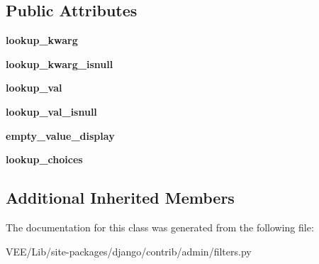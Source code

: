 \subsection*{Public Attributes}
\begin{DoxyCompactItemize}
\item 
\mbox{\label{classdjango_1_1contrib_1_1admin_1_1filters_1_1_all_values_field_list_filter_a2f0e069fadf4337d95d1338b167882f5}} 
{\bfseries lookup\+\_\+kwarg}
\item 
\mbox{\label{classdjango_1_1contrib_1_1admin_1_1filters_1_1_all_values_field_list_filter_abc33e49c3b986584bb404ca551a8854f}} 
{\bfseries lookup\+\_\+kwarg\+\_\+isnull}
\item 
\mbox{\label{classdjango_1_1contrib_1_1admin_1_1filters_1_1_all_values_field_list_filter_a2f6103d6492548bc1e160cb3daaf8db0}} 
{\bfseries lookup\+\_\+val}
\item 
\mbox{\label{classdjango_1_1contrib_1_1admin_1_1filters_1_1_all_values_field_list_filter_af6341d09b162d76a98a68b9562c5237c}} 
{\bfseries lookup\+\_\+val\+\_\+isnull}
\item 
\mbox{\label{classdjango_1_1contrib_1_1admin_1_1filters_1_1_all_values_field_list_filter_a3d4e19bc502d9f7c76ff21527455c6dd}} 
{\bfseries empty\+\_\+value\+\_\+display}
\item 
\mbox{\label{classdjango_1_1contrib_1_1admin_1_1filters_1_1_all_values_field_list_filter_a0658c943b541f0e975a56d1aecc956c7}} 
{\bfseries lookup\+\_\+choices}
\end{DoxyCompactItemize}
\subsection*{Additional Inherited Members}


The documentation for this class was generated from the following file\+:\begin{DoxyCompactItemize}
\item 
V\+E\+E/\+Lib/site-\/packages/django/contrib/admin/filters.\+py\end{DoxyCompactItemize}
